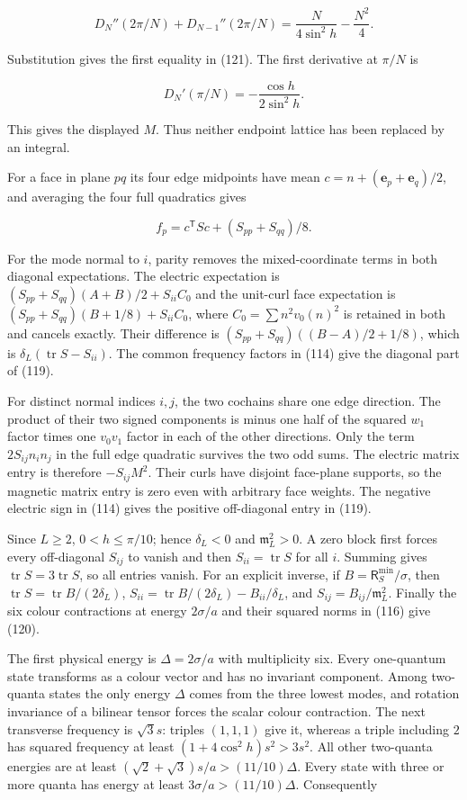 \[
D_N''(2\pi/N)+D_{N-1}''(2\pi/N)
 =\frac{N}{4\sin^2h}-\frac{N^2}4.
\]

Substitution gives the first equality in (121). The first derivative at
\(\pi/N\) is

\[
D_N'(\pi/N)=-\frac{\cos h}{2\sin^2h}.
\]

This gives the displayed \(M\). Thus neither endpoint lattice has been
replaced by an integral.

For a face in plane \(pq\) its four edge midpoints have mean
\(c=n+(\mathbf e_p+\mathbf e_q)/2\), and averaging the four full
quadratics gives

\[
f_p=c^{\mathsf T}S c+(S_{pp}+S_{qq})/8 .
\]

For the mode normal to \(i\), parity removes the mixed-coordinate terms
in both diagonal expectations. The electric expectation is
\((S_{pp}+S_{qq})(A+B)/2+S_{ii}C_0\) and the unit-curl face expectation
is \((S_{pp}+S_{qq})(B+1/8)+S_{ii}C_0\), where \(C_0=\sum n^2v_0(n)^2\)
is retained in both and cancels exactly. Their difference is
\((S_{pp}+S_{qq})((B-A)/2+1/8)\), which is
\(\delta_L(\operatorname{tr}S-S_{ii})\). The common frequency factors in
(114) give the diagonal part of (119).

For distinct normal indices \(i,j\), the two cochains share one edge
direction. The product of their two signed components is minus one half
of the squared \(w_1\) factor times one \(v_0v_1\) factor in each of the
other directions. Only the term \(2S_{ij}n_in_j\) in the full edge
quadratic survives the two odd sums. The electric matrix entry is
therefore \(-S_{ij}M^2\). Their curls have disjoint face-plane supports,
so the magnetic matrix entry is zero even with arbitrary face weights.
The negative electric sign in (114) gives the positive off-diagonal
entry in (119).

Since \(L\ge2\), \(0<h\le\pi/10\); hence \(\delta_L<0\) and
\(\mathfrak m_L^2>0\). A zero block first forces every off-diagonal
\(S_{ij}\) to vanish and then \(S_{ii}=\operatorname{tr}S\) for all
\(i\). Summing gives \(\operatorname{tr}S=3\operatorname{tr}S\), so all
entries vanish. For an explicit inverse, if
\(B=\mathsf R_S^{\min}/\sigma\), then
\(\operatorname{tr}S=\operatorname{tr}B/(2\delta_L)\),
\(S_{ii}=\operatorname{tr}B/(2\delta_L)-B_{ii}/\delta_L\), and
\(S_{ij}=B_{ij}/\mathfrak m_L^2\). Finally the six colour contractions
at energy \(2\sigma/a\) and their squared norms in (116) give (120).

The first physical energy is \(\Delta=2\sigma/a\) with multiplicity six.
Every one-quantum state transforms as a colour vector and has no
invariant component. Among two-quanta states the only energy \(\Delta\)
comes from the three lowest modes, and rotation invariance of a bilinear
tensor forces the scalar colour contraction. The next transverse
frequency is \(\sqrt3s\): triples \((1,1,1)\) give it, whereas a triple
including \(2\) has squared frequency at least \((1+4\cos^2h)s^2>3s^2\).
All other two-quanta energies are at least
\((\sqrt2+\sqrt3)s/a>(11/10)\Delta\). Every state with three or more
quanta has energy at least \(3\sigma/a>(11/10)\Delta\). Consequently


